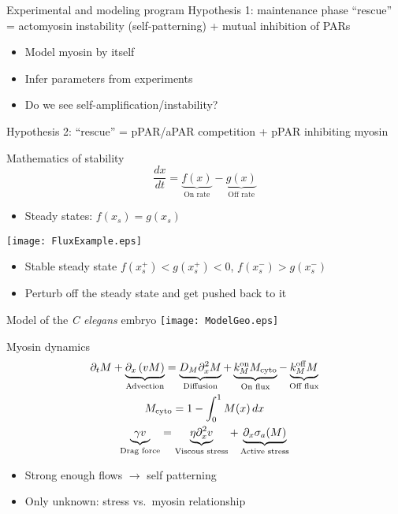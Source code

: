 \documentclass{beamer}
\newcommand{\6}[1]{#1_{\text{6}}}
\newcommand{\3}[1]{#1_{\text{3}}}
\newcommand{\My}[1]{#1_M}
\newcommand\blfootnote[1]{%
  \begingroup
  \renewcommand\thefootnote{}\flushleft{\footnote{#1}}%
  \addtocounter{footnote}{-1}%
  \endgroup
}
\begin{document}
\begin{frame}{Experimental and modeling program}
Hypothesis 1: maintenance phase ``rescue'' = actomyosin instability (self-patterning) + mutual inhibition of PARs
\begin{itemize}
\item Model myosin by itself
\item Infer parameters from experiments
\item Do we see self-amplification/instability?
\end{itemize}
Hypothesis 2: ``rescue'' = pPAR/aPAR competition + pPAR inhibiting myosin 
\end{frame}

\begin{frame}{Mathematics of stability}
$$\frac{dx}{dt}=\underbrace{f(x)}_\text{On rate}-\underbrace{g(x)}_\text{Off rate}$$
\begin{itemize}
\item Steady states: $f(x_s)=g(x_s)$
\end{itemize}
\begin{center}
\texttt{[image: FluxExample.eps]}
\end{center}
\begin{itemize}
\item Stable steady state $f(x_s^+) < g(x_s^+) < 0$,  $f(x_s^-)  > g(x_s^-)$
\item Perturb off the steady state and get pushed back to it
\end{itemize}
\end{frame}

\begin{frame}{Model of the \emph{C elegans} embryo}
\centering
\texttt{[image: ModelGeo.eps]}

\end{frame}

\begin{frame}{Myosin dynamics}
\begin{gather*}
\Dt M + \underbrace{\Dx \left(v M\right)}_\text{Advection} = \underbrace{D_M \Dx^2 M}_\text{Diffusion} +\underbrace{\My{\kon}M_\text{cyto}}_\text{On flux} - \underbrace{\My{\koff} M}_\text{Off flux} \\
M_\text{cyto} =  1 - \int_0^1 M(x) \, dx \\
\underbrace{\gamma v}_\text{Drag force} = \underbrace{\eta \Dx^2 v}_\text{Viscous stress} + \underbrace{\Dx \sigma_a(M)}_\text{Active stress}
\end{gather*}
\begin{itemize}
\item Strong enough flows $\rightarrow$ self patterning
\item Only unknown: stress vs.\ myosin relationship 
\end{itemize}

\blfootnote{\tiny{Bois et al. \emph{PRL} (2011)}}
\end{frame}
\end{document}
